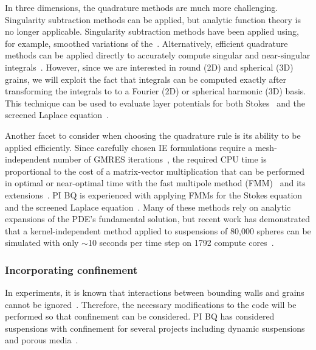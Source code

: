 In three dimensions, the quadrature methods are much more challenging.
Singularity subtraction methods can be applied, but analytic function
theory is no longer applicable. Singularity subtraction methods have
been applied using, for example, smoothed variations of
the~\cite{beale1, cor2001, tlu-bea2019}. Alternatively, efficient
quadrature methods can be applied directly to accurately compute
singular and near-singular integrals~\cite{khayat_2005,
gimbutas2013sisc}. However, since we are interested in round (2D) and
spherical (3D) grains, we will exploit the fact that integrals can be
computed exactly after transforming the integrals to to a Fourier (2D)
or spherical harmonic (3D) basis. This technique can be used to evaluate
layer potentials for both Stokes~\cite{cor-vee2018} and the screened
Laplace equation~\cite{koh-cor-che-vee2021}.

Another facet to consider when choosing the quadrature rule is its
ability to be applied efficiently. Since carefully chosen IE
formulations require a mesh-independent number of GMRES
iterations~\cite{cam-ips-kel-mey-xue1996}, the required CPU time is
proportional to the cost of a matrix-vector multiplication that can be
performed in optimal or near-optimal time with the fast multipole method
(FMM)~\cite{fmm5} and its extensions~\cite{fmm1, fmm2, fmm3, fmm4, fmm6,
fmm7, ros-ols2016}. PI BQ is experienced with applying FMMs for the
Stokes equation~\cite{qua-bir2014, bys-sha-qua2020} and the screened
Laplace equation~\cite{kro-qua2011, qua2011}. Many of these methods rely
on analytic expansions of the PDE's fundamental solution, but recent
work has demonstrated that a kernel-independent method applied to
suspensions of 80,000 spheres can be simulated with only $\sim$10
seconds per time step on 1792 compute cores~\cite{Yan2019}.

%

\subsubsection{Incorporating confinement}
\label{subsec:Confinement}
In experiments, it is known that interactions between bounding walls and
grains cannot be ignored~\cite{qua-gan-you2021,
KaouiHartingMisbah2011_PRE, her-sto-gra2005}. Therefore, the necessary
modifications to the code will be performed so that confinement can be
considered. PI BQ has considered suspensions with confinement for
several projects including dynamic suspensions~\cite{qua-bir2014,
bys-sha-qua2020} and porous media~\cite{chi-moo-qua2020,
dea-qua-bir-jua2018, moo-che-chi-qua2022, qua-gan-you2021}.


